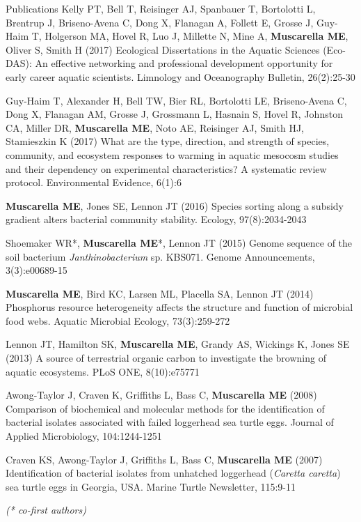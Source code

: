 \documentclass{resume} %
\begin{document}
\begin{rSection}{Publications}
Kelly PT, Bell T, Reisinger AJ, Spanbauer T, Bortolotti L, Brentrup J,
Briseno-Avena C, Dong X,  Flanagan A, Follett E, Grosse J, Guy-Haim T,
Holgerson MA, Hovel R, Luo J, Millette N, Mine A, {\bf Muscarella ME},
Oliver S, Smith H (2017) Ecological Dissertations in the Aquatic Sciences
(Eco-DAS): An effective networking and professional development opportunity
for early career aquatic scientists.
Limnology and Oceanography Bulletin, 26(2):25-30

Guy-Haim T, Alexander H, Bell TW, Bier RL, Bortolotti LE, Briseno-Avena C,
Dong X, Flanagan AM, Grosse J, Grossmann L, Hasnain S, Hovel R, Johnston CA,
Miller DR, {\bf Muscarella ME}, Noto AE, Reisinger AJ, Smith HJ, Stamieszkin K
(2017) What are the type, direction, and strength of species, community, and
ecosystem responses to warming in aquatic mesocosm studies and their dependency
on experimental characteristics? A systematic review protocol.
Environmental Evidence, 6(1):6

{\bf Muscarella ME}, Jones SE, Lennon JT (2016) Species sorting along a
subsidy gradient alters bacterial community stability. Ecology, 97(8):2034-2043

Shoemaker WR*, {\bf Muscarella ME}*, Lennon JT (2015) Genome sequence of the
soil bacterium {\em Janthinobacterium} sp. KBS071. Genome Announcements,
3(3):e00689-15

{\bf Muscarella ME}, Bird KC, Larsen ML, Placella SA, Lennon JT (2014)
Phosphorus resource heterogeneity affects the structure and function of
microbial food webs. Aquatic Microbial Ecology, 73(3):259-272

Lennon JT, Hamilton SK, {\bf Muscarella ME}, Grandy AS, Wickings K, Jones SE
(2013) A source of terrestrial organic carbon to investigate the browning of
aquatic ecosystems. PLoS ONE, 8(10):e75771

Awong-Taylor J, Craven K, Griffiths L, Bass C, {\bf Muscarella ME} (2008)
Comparison of biochemical and molecular methods for the identification of
bacterial isolates associated with failed loggerhead sea turtle eggs. Journal of
Applied Microbiology, 104:1244-1251

Craven KS, Awong-Taylor J, Griffiths L, Bass C, {\bf Muscarella ME} (2007)
Identification of bacterial isolates from unhatched loggerhead
({\em Caretta caretta}) sea turtle eggs in Georgia, USA.
Marine Turtle Newsletter, 115:9-11

{\em (* co-first authors)}

\end{rSection}
\end{document}
